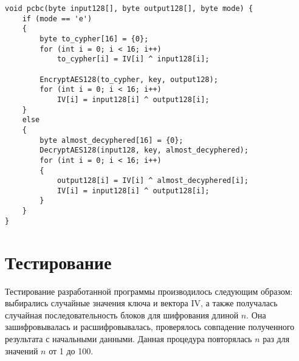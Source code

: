 \clearpage

\begin{center}
    \captionsetup{justification=raggedright,singlelinecheck=off}
    \begin{lstlisting}[label=lst:pcbc,caption=Реализация режима работы PCBC]
void pcbc(byte input128[], byte output128[], byte mode) {
    if (mode == 'e')
    {
        byte to_cypher[16] = {0};
        for (int i = 0; i < 16; i++)
            to_cypher[i] = IV[i] ^ input128[i];

        EncryptAES128(to_cypher, key, output128);
        for (int i = 0; i < 16; i++)
            IV[i] = input128[i] ^ output128[i];
    }
    else
    {
        byte almost_decyphered[16] = {0};
        DecryptAES128(input128, key, almost_decyphered);
        for (int i = 0; i < 16; i++)
        {
            output128[i] = IV[i] ^ almost_decyphered[i];
            IV[i] = input128[i] ^ output128[i];
        }
    }
}
\end{lstlisting}
\end{center}

\section{Тестирование}

Тестирование разработанной программы производилось следующим образом: выбирались случайные значения ключа и вектора IV, а также получалась случайная последовательность блоков для шифрования длиной $n$. Она зашифровывалась и расшифровывалась, проверялось совпадение полученного результата с начальными данными. Данная процедура повторялась $n$ раз для значений $n$ от 1 до 100.

